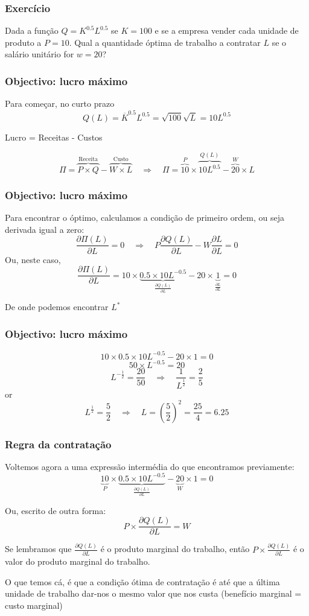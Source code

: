 \begin{frame}
	\frametitle{Exerc\'icio}
	Dada a fun\c c\~ao $Q=K^{0.5}L^{0.5}$ se $K=100$ e se a empresa vender cada unidade de produto a $P=10$. Qual a quantidade \'optima de trabalho a contratar $L$ se o sal\'ario unit\'ario for $w=20$?
\end{frame}

\begin{frame}
	\frametitle{Objectivo: lucro m\'aximo}

	Para come\c car, \pause no curto prazo \[Q(L)=\overline{K}^{0.5}L^{0.5}=\sqrt{100}\sqrt{L}=10 L^{0.5}\] \pause

	Lucro = Receitas - Custos \pause

	\[\Pi = \overbrace{P\times Q}^{\text{Receita}}-\overbrace{W\times L}^{\text{Custo}}\quad\Rightarrow\quad \Pi=\overbrace{10}^{P}\times\overbrace{10L^{0.5}}^{Q(L)} - \overbrace{20}^{W}\times L\] 

\end{frame}

\begin{frame}
	\frametitle{Objectivo: lucro m\'aximo}

	Para encontrar o \'optimo, calculamos a condi\c c\~ao de primeiro ordem, ou seja derivada igual a zero:
	\[\frac{\partial \Pi(L)}{\partial L}=0\quad\Rightarrow\quad P\frac{\partial Q(L)}{\partial L}-W\frac{\partial L}{\partial L}=0\]
	Ou, neste caso,
	\[\frac{\partial \Pi(L)}{\partial L}=10\times \underbrace{0.5 \times 10 L^{-0.5}}_{\frac{\partial Q(L)}{\partial L}} - 20 \times \underbrace{1}_{\frac{\partial L}{\partial L}} = 0\]

	De onde podemos encontrar $L^*$

\end{frame}

\begin{frame}
	\frametitle{Objectivo: lucro m\'aximo}
	\[10\times 0.5 \times 10 L^{-0.5} - 20 \times 1 = 0\]
	\[50\times L^{-0.5} = 20\]
	\[L^{-\frac{1}{2}}=\frac{20}{50}\quad \Rightarrow\quad \frac{1}{L^{\frac{1}{2}}}=\frac{2}{5}\]
	or
	\[L^{\frac{1}{2}}=\frac{5}{2}\quad\Rightarrow\quad L=\left(\frac{5}{2}\right)^2=\frac{25}{4}=6.25\]
\end{frame}

\begin{frame}
	\frametitle{Regra da contrata\c c\~ao}
	Voltemos agora a uma express\~ao interm\'edia do que encontramos previamente:
	\[\underbrace{10}_{P}\times \underbrace{0.5 \times 10 L^{-0.5}}_{\frac{\partial Q(L)}{\partial L}} - \underbrace{20}_{W} \times 1 = 0\]

	Ou, escrito de outra forma:
	\[P \times \frac{\partial Q(L)}{\partial L} = W\]

Se lembramos que $\frac{\partial Q(L)}{\partial L}$ \'e o produto marginal do trabalho, ent\~ao $P\times \frac{\partial Q(L)}{\partial L}$ \'e o valor do produto marginal do trabalho.

O que temos c\'a, \'e que a condi\c c\~ao \'otima de contrata\c c\~ao \'e at\'e que a \'ultima unidade de trabalho dar-nos o mesmo valor que nos custa (benef\'icio marginal = custo marginal)
\end{frame}

